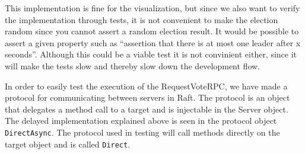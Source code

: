 This implementation is fine for the visualization, but since we also want to verify the implementation through tests, it is not convenient to make the election random since you cannot assert a random election result. It would be possible to assert a given property such as ``assertion that there is at most one leader after x seconds''. Although this could be a viable test it is not convinient either, since it will make the tests slow and thereby slow down the development flow.

In order to easily test the execution of the RequestVoteRPC, we have made a protocol for communicating between servers in Raft. The protocol is an object that delegates a method call to a target and is injectable in the Server object. The delayed implementation explained above is seen in the protocol object \verb$DirectAsync$. The protocol used in testing will call methods directly on the target object and is called \verb$Direct$.


%

